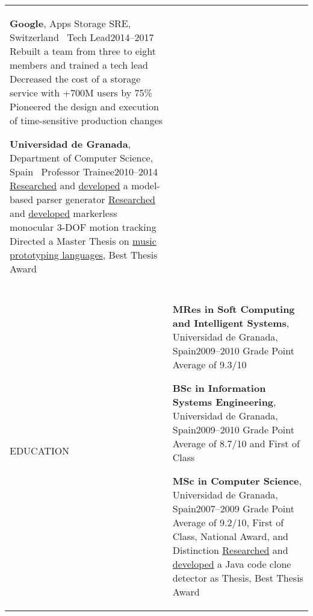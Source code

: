 \documentclass[letterpaper,10pt,oneside]{article}
\newcommand{\DatestampY}[1]{#1}
\newenvironment{body}
{\par\par
\begin{longtable}{p{0.142\textwidth}p{0.807\textwidth}}}
{\par\end{longtable}\par}
\renewcommand{\section}[3]{\\[-0.6cm]\pdfbookmark[2]{#2}{#3}\\%
\raggedleft  %
{\fontsize{9.5pt}{9.5pt}\selectfont\bfseries\raggedright%
\MakeUppercase{#1}}&}
\newcommand{\SmallEntryGap}{\par\vspace{0.27em}\par}
\begin{document}
\begin{body}
\SmallEntryGap

\textbf{Google}, Apps Storage SRE, Switzerland \textemdash\ Tech Lead\hfill \DatestampY{2014}--\DatestampY{2017}\newline
\phantom{w}Rebuilt a team from three to eight members and trained a tech lead\newline
\phantom{w}Decreased the cost of a storage service with +700M users by 75\%\newline
\phantom{w}Pioneered the design and execution of time-sensitive production changes

\SmallEntryGap

\textbf{Universidad de Granada}, Department of Computer Science, Spain \textemdash\ Professor Trainee\hfill \DatestampY{2010}--\DatestampY{2014} \newline
\phantom{w}\href{https://doi.org/10.1142/S0218194014500375}{Researched} and \href{https://github.com/lquesada/ModelCC}{developed} a model-based parser generator \newline
\phantom{w}\href{https://doi.org/10.1142/S0129065712500190}{Researched} and \href{https://github.com/lquesada/MotionTracking}{developed} markerless monocular 3-DOF motion tracking \newline
\phantom{w}Directed a Master Thesis on \href{https://github.com/lquesada/ADAgio}{music prototyping languages}, Best Thesis Award


\section{Education}{Education}{PDF:Education}

\textbf{MRes in Soft Computing and Intelligent Systems}, Universidad de Granada, Spain\hfill \DatestampY{2009}--\DatestampY{2010} \newline
\phantom{w}Grade Point Average of 9.3/10

\SmallEntryGap

\textbf{BSc in Information Systems Engineering}, Universidad de Granada, Spain\hfill \DatestampY{2009}--\DatestampY{2010} \newline
\phantom{w}Grade Point Average of 8.7/10 and First of Class

\SmallEntryGap

\textbf{MSc in Computer Science}, Universidad de Granada, Spain\hfill \DatestampY{2007}--\DatestampY{2009} \newline
\phantom{w}Grade Point Average of 9.2/10, First of Class, National Award, and Distinction \newline
\phantom{w}\href{https://doi.org/10.5220/0003013403330336}{Researched} and \href{https://github.com/lquesada/JSimil}{developed} a Java code clone detector as Thesis, Best Thesis Award


\end{body}
\end{document}
